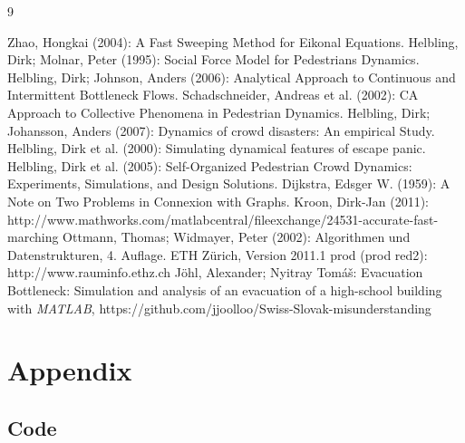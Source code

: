 \documentclass[11pt]{article}
\begin{document}
\begin{thebibliography} {9}
	
	 Zhao, Hongkai (2004): A Fast Sweeping Method for Eikonal Equations.
	 Helbling, Dirk; Molnar, Peter (1995): Social Force Model for Pedestrians Dynamics.
	 Helbling, Dirk; Johnson, Anders (2006): Analytical Approach to Continuous and Intermittent Bottleneck Flows.
	 Schadschneider, Andreas et al. (2002): CA Approach to Collective Phenomena in Pedestrian Dynamics.	
	 Helbling, Dirk; Johansson, Anders (2007): Dynamics of crowd disasters: An empirical Study.
	 Helbling, Dirk et al. (2000): Simulating dynamical features of escape panic.
	 Helbling, Dirk et al. (2005): Self-Organized Pedestrian Crowd Dynamics: Experiments, Simulations, and Design Solutions.
	 Dijkstra, Edsger W. (1959): A Note on Two Problems in Connexion with Graphs.
	 Kroon, Dirk-Jan (2011): http://www.mathworks.com/matlabcentral/fileexchange/24531-accurate-fast-marching
	 Ottmann, Thomas; Widmayer, Peter (2002): Algorithmen und Datenstrukturen, 4. Auflage.
	 ETH Zürich, Version 2011.1 prod (prod red2): http://www.rauminfo.ethz.ch
	 Jöhl, Alexander; Nyitray Tom\'{a}\v{s}: Evacuation Bottleneck: Simulation and analysis of an evacuation of a high-school building with \textit{MATLAB}, https://github.com/jjoolloo/Swiss-Slovak-misunderstanding

\end{thebibliography}


\section{Appendix}

\subsection{Code}


\end{document}
